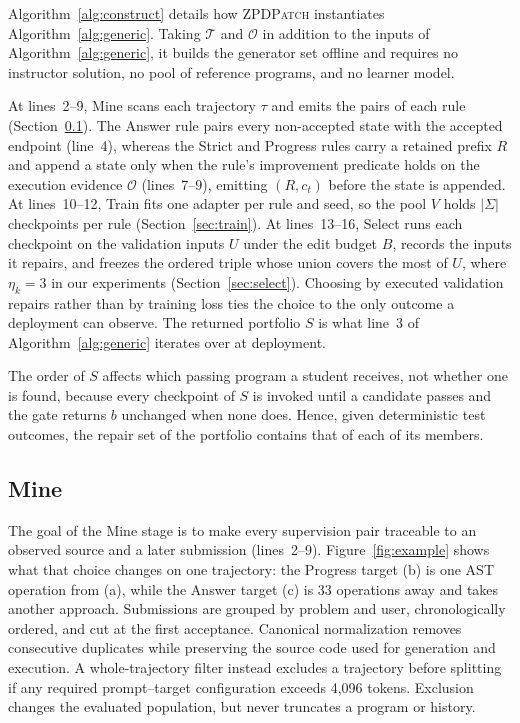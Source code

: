 \documentclass[10pt,conference]{IEEEtran}
\begin{document}
Algorithm~\ref{alg:construct} details how \textsc{ZPDPatch} instantiates Algorithm~\ref{alg:generic}. Taking \(\mathcal T\) and \(\mathcal O\) in addition to the inputs of Algorithm~\ref{alg:generic}, it builds the generator set offline and requires no instructor solution, no pool of reference programs, and no learner model.

At lines~2--9, Mine scans each trajectory \(\tau\) and emits the pairs of each rule (Section~\ref{sec:mine}). The Answer rule pairs every non-accepted state with the accepted endpoint (line~4), whereas the Strict and Progress rules carry a retained prefix \(R\) and append a state only when the rule's improvement predicate holds on the execution evidence \(\mathcal O\) (lines~7--9), emitting \((R,c_t)\) before the state is appended. At lines~10--12, Train fits one adapter per rule and seed, so the pool \(V\) holds \(|\Sigma|\) checkpoints per rule (Section~\ref{sec:train}). At lines~13--16, Select runs each checkpoint on the validation inputs \(U\) under the edit budget \(B\), records the inputs it repairs, and freezes the ordered triple whose union covers the most of \(U\), where \(\eta_k=3\) in our experiments (Section~\ref{sec:select}). Choosing by executed validation repairs rather than by training loss ties the choice to the only outcome a deployment can observe. The returned portfolio \(S\) is what line~3 of Algorithm~\ref{alg:generic} iterates over at deployment.

The order of \(S\) affects which passing program a student receives, not whether one is found, because every checkpoint of \(S\) is invoked until a candidate passes and the gate returns \(b\) unchanged when none does. Hence, given deterministic test outcomes, the repair set of the portfolio contains that of each of its members.


\subsection{Mine}
\label{sec:mine}

The goal of the Mine stage is to make every supervision pair traceable to an observed source and a later submission (lines~2--9). Figure~\ref{fig:example} shows what that choice changes on one trajectory: the Progress target (b) is one AST operation from (a), while the Answer target (c) is 33 operations away and takes another approach. Submissions are grouped by problem and user, chronologically ordered, and cut at the first acceptance. Canonical normalization removes consecutive duplicates while preserving the source code used for generation and execution. A whole-trajectory filter instead excludes a trajectory before splitting if any required prompt--target configuration exceeds 4,096 tokens. Exclusion changes the evaluated population, but never truncates a program or history.
\end{document}
